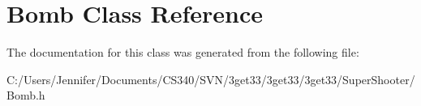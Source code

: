 \hypertarget{class_bomb}{
\section{Bomb Class Reference}
\label{class_bomb}
}


The documentation for this class was generated from the following file:\begin{DoxyCompactItemize}
\item 
C:/Users/Jennifer/Documents/CS340/SVN/3get33/3get33/3get33/SuperShooter/Bomb.h\end{DoxyCompactItemize}
